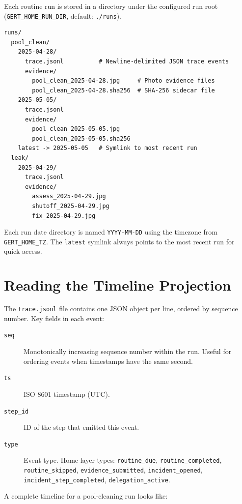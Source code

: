 Each routine run is stored in a directory under the configured run root
(\texttt{GERT\_HOME\_RUN\_DIR}, default: \texttt{./runs}).

\begin{verbatim}
runs/
  pool_clean/
    2025-04-28/
      trace.jsonl          # Newline-delimited JSON trace events
      evidence/
        pool_clean_2025-04-28.jpg     # Photo evidence files
        pool_clean_2025-04-28.sha256  # SHA-256 sidecar file
    2025-05-05/
      trace.jsonl
      evidence/
        pool_clean_2025-05-05.jpg
        pool_clean_2025-05-05.sha256
    latest -> 2025-05-05   # Symlink to most recent run
  leak/
    2025-04-29/
      trace.jsonl
      evidence/
        assess_2025-04-29.jpg
        shutoff_2025-04-29.jpg
        fix_2025-04-29.jpg
\end{verbatim}

Each run date directory is named \texttt{YYYY-MM-DD} using the timezone from
\texttt{GERT\_HOME\_TZ}. The \texttt{latest} symlink always points to the most recent run
for quick access.

\section{Reading the Timeline Projection}
\label{sec:evidence-timeline}

The \texttt{trace.jsonl} file contains one JSON object per line, ordered by sequence number.
Key fields in each event:

\begin{description}
  \item[\texttt{seq}] Monotonically increasing sequence number within the run. Useful for
        ordering events when timestamps have the same second.
  \item[\texttt{ts}] ISO 8601 timestamp (UTC).
  \item[\texttt{step\_id}] ID of the step that emitted this event.
  \item[\texttt{type}] Event type. Home-layer types: \texttt{routine\_due},
        \texttt{routine\_completed}, \texttt{routine\_skipped}, \texttt{evidence\_submitted},
        \texttt{incident\_opened}, \texttt{incident\_step\_completed},
        \texttt{delegation\_active}.
\end{description}

A complete timeline for a pool-cleaning run looks like:

